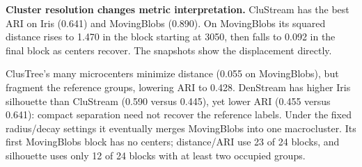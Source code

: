 \textbf{Cluster resolution changes metric interpretation.} CluStream has the best ARI on Iris (0.641) and MovingBlobs (0.890). On MovingBlobs its squared distance rises to 1.470 in the block starting at 3050, then falls to 0.092 in the final block as centers recover. The snapshots show the displacement directly.

ClusTree's many microcenters minimize distance (0.055 on MovingBlobs), but fragment the reference groups, lowering ARI to 0.428. DenStream has higher Iris silhouette than CluStream (0.590 versus 0.445), yet lower ARI (0.455 versus 0.641): compact separation need not recover the reference labels. Under the fixed radius/decay settings it eventually merges MovingBlobs into one macrocluster. Its first MovingBlobs block has no centers; distance/ARI use 23 of 24 blocks, and silhouette uses only 12 of 24 blocks with at least two occupied groups.
